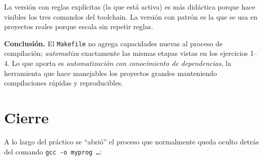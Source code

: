 \documentclass[11pt,a4paper]{article}
\begin{document}
La versión con reglas explícitas (la que está activa) es más
didáctica porque hace visibles los tres comandos del toolchain. La
versión con patrón es la que se usa en proyectos reales porque escala
sin repetir reglas.

\textbf{Conclusión.} El \texttt{Makefile} no agrega capacidades nuevas
al proceso de compilación; \emph{automatiza} exactamente las mismas
etapas vistas en los ejercicios 1--4. Lo que aporta es
\emph{automatización con conocimiento de dependencias}, la
herramienta que hace manejables los proyectos grandes manteniendo
compilaciones rápidas y reproducibles.

\section*{Cierre}

A lo largo del práctico se ``abrió'' el proceso que normalmente queda
oculto detrás del comando \texttt{gcc -o myprog \dots}:
\end{document}

